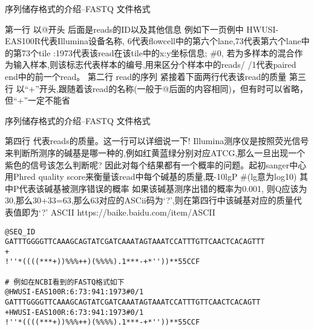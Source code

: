 \begin{frame}[fragile]{序列储存格式的介绍--FASTQ 文件格式}
    \begin{myoutline}
        \1 第一行
            \2 以@开头
            \2 后面是reads的ID以及其他信息
            \2 例如下一页例中 HWUSI-EAS100R代表Illumina设备名称,
            \2 6代表flowcell中的第六个lane,73代表第六个lane中的第73个tile
            :1973代表该read在该tile中的x:y坐标信息;
            \2 \#0, 若为多样本的混合作为输入样本,则该标志代表样本的编号,用来区分个样本中的reads/
            \2 /1代表paired end中的前一个read。
        \1 第二行
            \2 read的序列
            \2 紧接着下面两行代表该read的质量
        \1 第三行
            \2 以“+”开头,跟随着该read的名称(一般于@后面的内容相同)，但有时可以省略，但“+”一定不能省
    \end{myoutline}
\end{frame}
\begin{frame}[fragile]{序列储存格式的介绍--FASTQ 文件格式}
    \begin{myoutline}
        \1 第四行
        \2 代表reads的质量。这一行可以详细说一下!
        \2 Illumina测序仪是按照荧光信号来判断所测序的碱基是哪一种的,例如红黄蓝绿分别对应ATCG,那么一旦出现一个紫色的信号该怎么判断呢?
        \2 因此对每个结果都有一个概率的问题。起初sanger中心用Phred quality score来衡量该read中每个碱基的质量,既-10lgP \#(lg意为log10)
            \3 其中P代表该碱基被测序错误的概率
            \3 如果该碱基测序出错的概率为0.001, 则Q应该为30,那么30+33=63,那么63对应的ASCii码为`?',则在第四行中该碱基对应的质量代表值即为`?'
            \3 ASCII https://baike.baidu.com/item/ASCII
    \end{myoutline}
    \begin{lstlisting}
@SEQ_ID
GATTTGGGGTTCAAAGCAGTATCGATCAAATAGTAAATCCATTTGTTCAACTCACAGTTT
+
!''*((((***+))%%%++)(%%%%).1***-+*''))**55CCF

# 例如在NCBI看到的FASTQ格式如下
@HWUSI-EAS100R:6:73:941:1973#0/1
GATTTGGGGTTCAAAGCAGTATCGATCAAATAGTAAATCCATTTGTTCAACTCACAGTT
+HWUSI-EAS100R:6:73:941:1973#0/1
!''*((((***+))%%%++)(%%%%).1***-+*''))**55CCF
    \end{lstlisting}
\end{frame}

